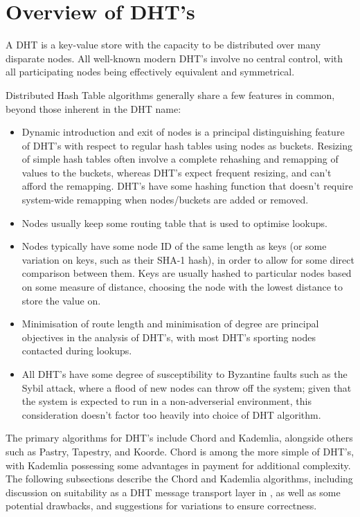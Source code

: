 \documentclass[10pt, a4paper]{article}
\begin{document}
\section{Overview of DHT's}

A DHT is a key-value store with the capacity to be distributed over many disparate nodes.
All well-known modern DHT's involve no central control, with all participating nodes being effectively equivalent and symmetrical.

Distributed Hash Table algorithms generally share a few features in common, beyond those inherent in the DHT name:
\begin{itemize}
	\item Dynamic introduction and exit of nodes is a principal distinguishing feature of DHT's with respect to regular hash tables using nodes as buckets.
		Resizing of simple hash tables often involve a complete rehashing and remapping of values to the buckets, whereas DHT's expect frequent resizing, and can't afford the remapping.
		DHT's have some hashing function that doesn't require system-wide remapping when nodes/buckets are added or removed.
	\item Nodes usually keep some routing table that is used to optimise lookups.
	\item Nodes typically have some node ID of the same length as keys (or some variation on keys, such as their SHA-1 hash), in order to allow for some direct comparison between them. Keys are usually hashed to particular nodes based on some measure of distance, choosing the node with the lowest distance to store the value on.
	\item Minimisation of route length and minimisation of degree are principal objectives in the analysis of DHT's, with most DHT's sporting  nodes contacted during lookups.
	\item All DHT's have some degree of susceptibility to Byzantine faults such as the Sybil attack, where a flood of new nodes can throw off the system; given that the \lsr{} system is expected to run in a non-adverserial environment, this consideration doesn't factor too heavily into choice of DHT algorithm.
\end{itemize}

The primary algorithms for DHT's include Chord and Kademlia, alongside others such as Pastry, Tapestry, and Koorde.
Chord is among the more simple of DHT's, with Kademlia possessing some advantages in payment for additional complexity.
The following subsections describe the Chord and Kademlia algorithms, including discussion on suitability as a DHT message transport layer in \lsr{}, as well as some potential drawbacks, and suggestions for variations to ensure correctness.
\end{document}
